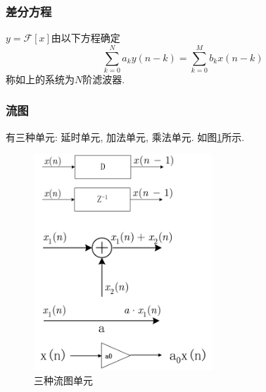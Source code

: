 \documentclass{ctexart}
\begin{document}
\subsubsection{差分方程}
    $y = \mathcal{F}[x]$由以下方程确定 \[
        \sum_{k = 0}^N a_k y(n - k)  = \sum_{k = 0}^M b_k x(n - k)\]
    称如上的系统为$N$阶滤波器.
\subsubsection{流图}
    有三种单元: 延时单元, 加法单元, 乘法单元. 如图\ref{sys-unit-graph}所示.
    \begin{figure}[ht!]
    \centering
    \includegraphics[width=0.6\textwidth]{sys-unit-graph.png}
    \caption{三种流图单元}
    \label{sys-unit-graph}
    \end{figure}
\end{document}
